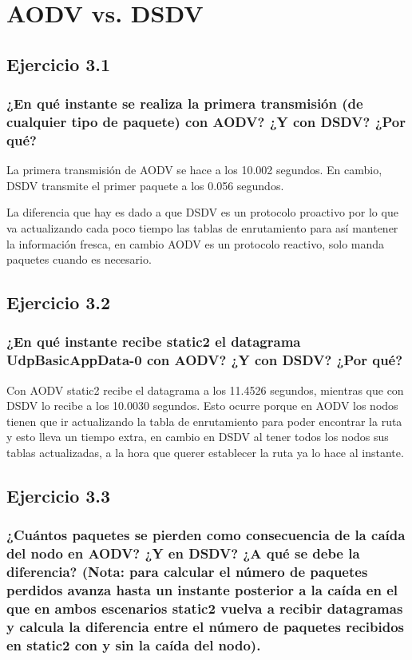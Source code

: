 \chapter{AODV vs. DSDV}
\label{chap:aodvdsdv}

\section{Ejercicio 3.1}

\subsection{¿En qué instante se realiza la primera transmisión (de cualquier tipo de paquete) con AODV? ¿Y con DSDV?
¿Por qué?}

La primera transmisión de AODV se hace a los 10.002 segundos. En cambio, DSDV transmite el primer paquete a los 0.056 segundos.

La diferencia que hay es dado a que DSDV es un protocolo proactivo por lo que va actualizando cada poco tiempo las tablas de enrutamiento para así mantener la información fresca, en cambio AODV es un protocolo reactivo, solo manda paquetes cuando es necesario.

\section{Ejercicio 3.2}

\subsection{¿En qué instante recibe static2 el datagrama UdpBasicAppData-0 con AODV? ¿Y con DSDV? ¿Por qué?}

Con AODV static2 recibe el datagrama a los 11.4526 segundos, mientras que con DSDV lo recibe a los 10.0030 segundos. Esto ocurre porque en AODV los nodos tienen que ir actualizando la tabla de enrutamiento para poder encontrar la ruta y esto lleva un tiempo extra, en cambio en DSDV al tener todos los nodos sus tablas actualizadas, a la hora que querer establecer la ruta ya lo hace al instante.


\section{Ejercicio 3.3}

\subsection{¿Cuántos paquetes se pierden como consecuencia de la caída del nodo en AODV? ¿Y en DSDV? ¿A qué se
debe la diferencia? (Nota: para calcular el número de paquetes perdidos avanza hasta un instante posterior a la
caída en el que en ambos escenarios static2 vuelva a recibir datagramas y calcula la diferencia entre el número
de paquetes recibidos en static2 con y sin la caída del nodo).}

